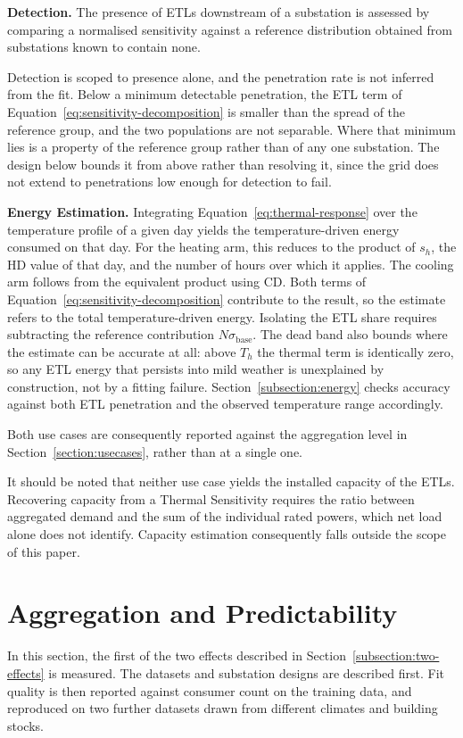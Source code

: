 \documentclass[9pt,journal,a4]{IEEEtran}
\begin{document}
\textbf{Detection.} The presence of ETLs downstream of a substation is assessed by comparing a normalised sensitivity against a reference distribution obtained from substations known to contain none.

Detection is scoped to presence alone, and the penetration rate is not inferred from the fit. Below a minimum detectable penetration, the ETL term of Equation~\eqref{eq:sensitivity-decomposition} is smaller than the spread of the reference group, and the two populations are not separable. Where that minimum lies is a property of the reference group rather than of any one substation. The design below bounds it from above rather than resolving it, since the grid does not extend to penetrations low enough for detection to fail.

\textbf{Energy Estimation.} Integrating Equation~\eqref{eq:thermal-response} over the temperature profile of a given day yields the temperature-driven energy consumed on that day. For the heating arm, this reduces to the product of $s_h$, the HD value of that day, and the number of hours over which it applies. The cooling arm follows from the equivalent product using CD. Both terms of Equation~\eqref{eq:sensitivity-decomposition} contribute to the result, so the estimate refers to the total temperature-driven energy. Isolating the ETL share requires subtracting the reference contribution $N \sigma_{\mathrm{base}}$. The dead band also bounds where the estimate can be accurate at all: above $T_h$ the thermal term is identically zero, so any ETL energy that persists into mild weather is unexplained by construction, not by a fitting failure. Section~\ref{subsection:energy} checks accuracy against both ETL penetration and the observed temperature range accordingly.

Both use cases are consequently reported against the aggregation level in Section~\ref{section:usecases}, rather than at a single one.

It should be noted that neither use case yields the installed capacity of the ETLs. Recovering capacity from a Thermal Sensitivity requires the ratio between aggregated demand and the sum of the individual rated powers, which net load alone does not identify. Capacity estimation consequently falls outside the scope of this paper.


\section{Aggregation and Predictability}
\label{section:aggregation}
In this section, the first of the two effects described in Section~\ref{subsection:two-effects} is measured. The datasets and substation designs are described first. Fit quality is then reported against consumer count on the training data, and reproduced on two further datasets drawn from different climates and building stocks.
\end{document}
